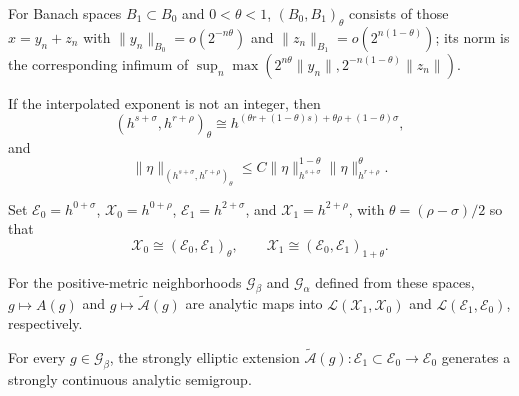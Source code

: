 \begin{definition}
\label{def:chow-iv-continuous-interpolation}
For Banach spaces $B_1\subset B_0$ and $0<\theta<1$, $(B_0,B_1)_\theta$
consists of those $x=y_n+z_n$ with
$\|y_n\|_{B_0}=o(2^{-n\theta})$ and
$\|z_n\|_{B_1}=o(2^{n(1-\theta)})$; its norm is the corresponding infimum of
$\sup_n\max(2^{n\theta}\|y_n\|,2^{-n(1-\theta)}\|z_n\|)$.
\end{definition}

\begin{lemma}
\label{lem:chow-iv-holder-interpolation}
If the interpolated exponent is not an integer, then
\begin{equation*}
 (h^{s+\sigma},h^{r+\rho})_\theta\cong
 h^{(\theta r+(1-\theta)s)+\theta\rho+(1-\theta)\sigma},
 \tag{35.15}
\end{equation*}
and
\begin{equation*}
 \|\eta\|_{(h^{s+\sigma},h^{r+\rho})_\theta}
 \le C\|\eta\|_{h^{s+\sigma}}^{1-\theta}
 \|\eta\|_{h^{r+\rho}}^\theta.
 \tag{35.16}
\end{equation*}
\end{lemma}

Set $\mathcal E_0=h^{0+\sigma}$, $\mathcal X_0=h^{0+\rho}$,
$\mathcal E_1=h^{2+\sigma}$, and $\mathcal X_1=h^{2+\rho}$, with
$\theta=(\rho-\sigma)/2$ so that
\begin{equation*}
 \mathcal X_0\cong(\mathcal E_0,\mathcal E_1)_\theta,
 \qquad \mathcal X_1\cong(\mathcal E_0,\mathcal E_1)_{1+\theta}.
 \tag{35.18}
\end{equation*}

\begin{lemma}
\label{lem:chow-iv-deturck-analytic-dependence}
For the positive-metric neighborhoods $\mathcal G_\beta$ and $\mathcal G_\alpha$
defined from these spaces, $g\mapsto A(g)$ and
$g\mapsto\widetilde{\mathcal A}(g)$ are analytic maps into
$\mathcal L(\mathcal X_1,\mathcal X_0)$ and
$\mathcal L(\mathcal E_1,\mathcal E_0)$, respectively.
\end{lemma}

\begin{lemma}
\label{lem:chow-iv-deturck-analytic-semigroup}
For every $g\in\mathcal G_\beta$, the strongly elliptic extension
$\widetilde{\mathcal A}(g):\mathcal E_1\subset\mathcal E_0\to\mathcal E_0$
generates a strongly continuous analytic semigroup.
\end{lemma}

